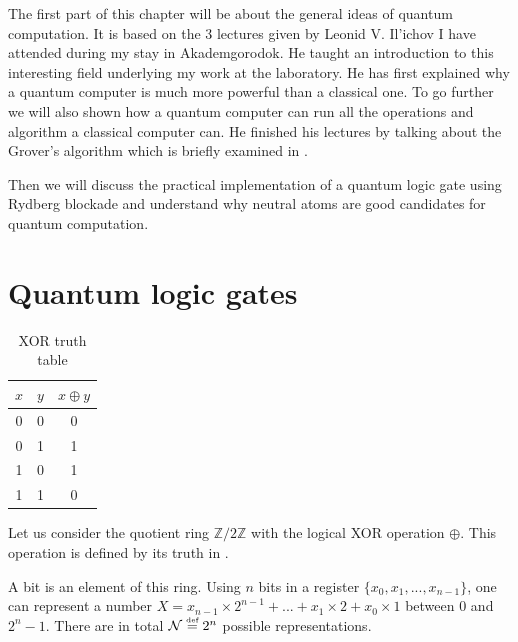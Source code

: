 \documentclass[%
]{scrreprt}
\newcommand{\defi}{\xspace\ensuremath{\overset{\text{\tiny def}}{=}}\xspace}
\begin{document}
\par The first part of this chapter will be about the general ideas of quantum computation. It is based on the 3 lectures given by Leonid V. Il'ichov I have attended during my stay in Akademgorodok. He taught an introduction to this interesting field underlying my work at the laboratory. He has first explained why a quantum computer is much more powerful than a classical one. To go further we will also shown how a quantum computer can run all the operations and algorithm a classical computer can. He finished his lectures by talking about the Grover's algorithm which is briefly examined in .

\par Then we will discuss the practical implementation of a quantum logic gate using Rydberg blockade and understand why neutral atoms are good candidates for quantum computation. 

\section{Quantum logic gates}

\begin{table}
  \vspace{-10pt}
  \centering
  \begin{tabular}{||c|c||c||}
    \hline
    $x$ & $y$ & $x \oplus y$\\
    \hline \hline
    0 & 0 & 0\\
    0 & 1 & 1\\
    1 & 0 & 1\\
    1 & 1 & 0\\
    \hline
  \end{tabular}
  \caption{\label{XOR-tab} XOR truth table}
  \vspace{-10pt}
\end{table}

\par Let us consider the quotient ring $\mathbb{Z}/2\mathbb{Z}$ with the logical XOR operation $\oplus$. This operation is defined by its truth in .

\par A bit is an element of this ring. Using $n$ bits in a register $\{ x_0, x_1, ..., x_{n-1} \}$, one can represent a number $X = x_{n-1} \times 2^{n-1} + ... + x_1 \times 2 + x_0 \times 1$ between $0$ and $2^n-1$. There are in total $\mathcal{N} \defi 2^n$ possible representations.
\end{document}
